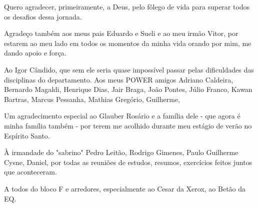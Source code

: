 \begin{agradecimentos}

Quero agradecer, primeiramente, a Deus, pelo fôlego de vida para superar todos os desafios dessa jornada.

Agradeço também aos meus pais Eduardo e Sueli e ao meu irmão Vitor, por estarem ao meu lado em todos os momentos da minha vida orando por mim, me dando apoio e força.

Ao Igor Cândido, que sem ele seria quase impossível passar pelas dificuldades das disciplinas do departamento. Aos meus POWER amigos Adriano Caldeira,  Bernardo Magaldi, Henrique Dias, Jair Braga, João Pontes, Júlio Franco,  Kawan Bartras, Marcus Pessanha, Mathias Gregório, Guilherme,  

Um agradecimento especial ao Glauber Rosário e a família dele - que agora é minha família também - por terem me acolhido durante meu estágio de verão no Espírito Santo.

À irmandade do "sabrino" Pedro Leitão, Rodrigo Gimenes, Paulo Guilherme Cysne, Daniel, por todas as reuniões de estudos, resumos, exercícios feitos juntos que aconteceram. 

A todos do bloco F e arredores, especialmente ao Cesar da Xerox, ao Betão da EQ.


\end{agradecimentos}